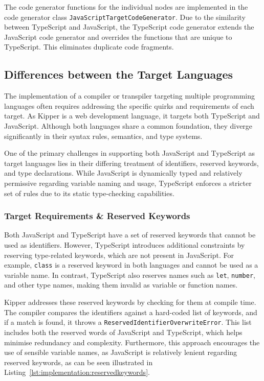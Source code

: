 The code generator functions for the individual nodes are implemented in the code generator class \lstinline|JavaScriptTargetCodeGenerator|. Due to the similarity between TypeScript and JavaScript, the TypeScript code generator extends the JavaScript code generator and overrides the functions that are unique to TypeScript. This eliminates duplicate code fragments.

\subsection{Differences between the Target Languages}

The implementation of a compiler or \gls{transpiler} targeting multiple programming languages often requires addressing the specific quirks and requirements of each target. As Kipper is a web development language, it targets both TypeScript and JavaScript. Although both languages share a common foundation, they diverge significantly in their syntax rules, semantics, and type systems.

One of the primary challenges in supporting both JavaScript and TypeScript as target languages lies in their differing treatment of identifiers, reserved keywords, and type declarations. While JavaScript is dynamically typed and relatively permissive regarding variable naming and usage, TypeScript enforces a stricter set of rules due to its static type-checking capabilities.

\subsubsection{Target Requirements \& Reserved Keywords}
\label{sec:target-requirements-and-reserved-keywords}

Both JavaScript and TypeScript have a set of reserved keywords that cannot be used as identifiers. However, TypeScript introduces additional constraints by reserving type-related keywords, which are not present in JavaScript. For example, \lstinline|class| is a reserved keyword in both languages and cannot be used as a variable name. In contrast, TypeScript also reserves names such as \lstinline|let|, \lstinline|number|, and other type names, making them invalid as variable or function names.

Kipper addresses these reserved keywords by checking for them at compile time. The compiler compares the identifiers against a hard-coded list of keywords, and if a match is found, it throws a \lstinline|ReservedIdentifierOverwriteError|. This list includes both the reserved words of JavaScript and TypeScript, which helps minimise redundancy and complexity. Furthermore, this approach encourages the use of sensible variable names, as JavaScript is relatively lenient regarding reserved keywords, as can be seen illustrated in Listing~\ref{lst:implementation:reservedkeywords}.

